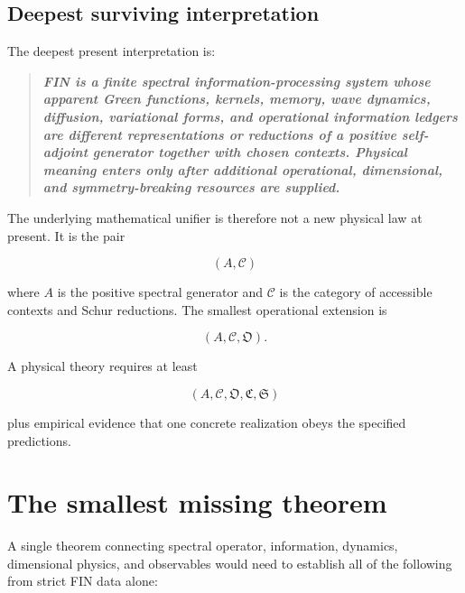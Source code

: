 \documentclass[11pt,a4paper,openany]{report}
\begin{document}
\section{Deepest surviving interpretation}

The deepest present interpretation is:

\begin{quote}\itshape
\textbf{FIN is a finite spectral information-processing system whose apparent Green functions, kernels, memory, wave dynamics, diffusion, variational forms, and operational information ledgers are different representations or reductions of a positive self-adjoint generator together with chosen contexts. Physical meaning enters only after additional operational, dimensional, and symmetry-breaking resources are supplied.}

\end{quote}

The underlying mathematical unifier is therefore not a new physical law at present. It is the pair

\[
\boxed{(A,\mathcal C)}
\]

where \(A\) is the positive spectral generator and \(\mathcal C\) is the category of accessible contexts and Schur reductions. The smallest operational extension is

\[
\boxed{(A,\mathcal C,\mathfrak O)}.
\]

A physical theory requires at least

\[
\boxed{(A,\mathcal C,\mathfrak O,\mathfrak C,\mathfrak S)}
\]

plus empirical evidence that one concrete realization obeys the specified predictions.

\chapter{The smallest missing theorem}

A single theorem connecting spectral operator, information, dynamics, dimensional physics, and observables would need to establish all of the following from strict FIN data alone:
\end{document}

